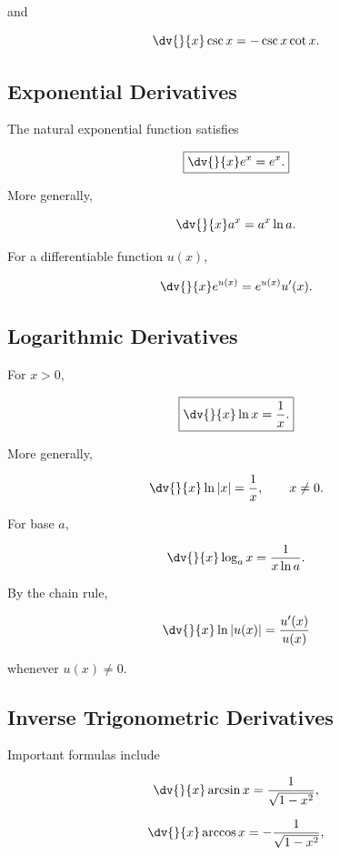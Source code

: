 and

\[ \dv{}{x}\csc x=-\csc x\cot x. \]

\subsection{Exponential Derivatives}
\label{subsec:exponential-derivatives}

The natural exponential function satisfies

\[ \boxed{\dv{}{x}e^x=e^x.} \]

More generally,

\[ \dv{}{x}a^x=a^x\ln a. \]

For a differentiable function \(u(x)\),

\[ \dv{}{x}e^{u(x)}=e^{u(x)}u'(x). \]

\subsection{Logarithmic Derivatives}
\label{subsec:logarithmic-derivatives}

For \(x>0\),

\[ \boxed{\dv{}{x}\ln x=\frac1x.} \]

More generally,

\[ \dv{}{x}\ln|x|=\frac1x,\qquad x\neq0. \]

For base \(a\),

\[ \dv{}{x}\log_a x=\frac{1}{x\ln a}. \]

By the chain rule,

\[ \dv{}{x}\ln|u(x)|=\frac{u'(x)}{u(x)} \]

whenever \(u(x)\neq0\).

\subsection{Inverse Trigonometric Derivatives}
\label{subsec:inverse-trigonometric-derivatives}

Important formulas include

\[ \dv{}{x}\arcsin x=\frac1{\sqrt{1-x^2}}, \]

\[ \dv{}{x}\arccos x=-\frac1{\sqrt{1-x^2}}, \]

